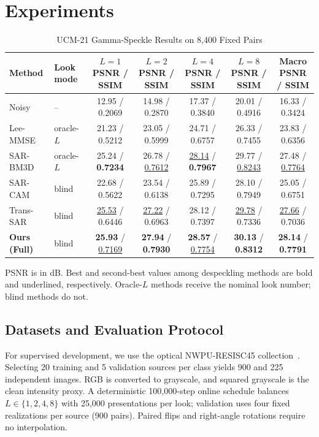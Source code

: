 \documentclass[conference]{IEEEtran}
\begin{document}
\section{Experiments}
\begin{table}[!t]
\caption{UCM-21 Gamma-Speckle Results on 8,400 Fixed Pairs}
\label{tab:main}
\centering
\footnotesize
\setlength{\tabcolsep}{3.2pt}
\renewcommand{\arraystretch}{1.08}
\begin{tabular}{@{}llccccc@{}}
\toprule
\textbf{Method} & \textbf{Look mode} &
\shortstack{\(L=1\)\\PSNR / SSIM} &
\shortstack{\(L=2\)\\PSNR / SSIM} &
\shortstack{\(L=4\)\\PSNR / SSIM} &
\shortstack{\(L=8\)\\PSNR / SSIM} &
\shortstack{Macro\\PSNR / SSIM} \\
\midrule
Noisy       & --                & 12.95 / 0.2069 & 14.98 / 0.2870 & 17.37 / 0.3840 & 20.01 / 0.4916 & 16.33 / 0.3424 \\
Lee-MMSE    & oracle-\(L\)      & 21.23 / 0.5212 & 23.05 / 0.5999 & 24.71 / 0.6757 & 26.33 / 0.7455 & 23.83 / 0.6356 \\
SAR-BM3D    & oracle-\(L\)      & 25.24 / \textbf{0.7234} & 26.78 / \underline{0.7612} & \underline{28.14} / \textbf{0.7967} & 29.77 / \underline{0.8243} & 27.48 / \underline{0.7764} \\
SAR-CAM     & blind             & 22.68 / 0.5622 & 23.54 / 0.6138 & 25.89 / 0.7295 & 28.10 / 0.7949 & 25.05 / 0.6751 \\
Trans-SAR   & blind             & \underline{25.53} / 0.6446 & \underline{27.22} / 0.6963 & 28.12 / 0.7397 & \underline{29.78} / 0.7336 & \underline{27.66} / 0.7036 \\
\textbf{Ours (Full)} & blind    & \textbf{25.93} / \underline{0.7169} & \textbf{27.94} / \textbf{0.7930} & \textbf{28.57} / \underline{0.7754} & \textbf{30.13} / \textbf{0.8312} & \textbf{28.14} / \textbf{0.7791} \\
\bottomrule
\end{tabular}
\vspace{1pt}
\parbox{0.98\textwidth}{\scriptsize PSNR is in dB. Best and second-best values among despeckling methods are bold and underlined, respectively. Oracle-\(L\) methods receive the nominal look number; blind methods do not.}
\end{table}

\subsection{Datasets and Evaluation Protocol}
For supervised development, we use the optical NWPU-RESISC45 collection~\cite{cheng2017}. Selecting 20 training and 5 validation sources per class yields 900 and 225 independent images. RGB is converted to grayscale, and squared grayscale is the clean intensity proxy. A deterministic 100,000-step online schedule balances \(L\in\{1,2,4,8\}\) with 25,000 presentations per look; validation uses four fixed realizations per source (900 pairs). Paired flips and right-angle rotations require no interpolation.
\end{document}
